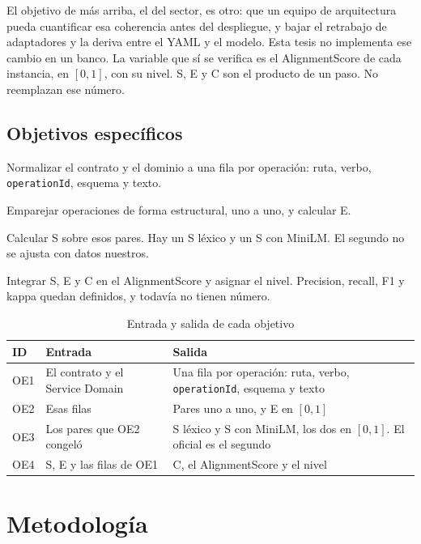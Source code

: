 El objetivo de más arriba, el del sector, es otro: que un equipo de arquitectura pueda cuantificar esa coherencia antes del despliegue, y bajar el retrabajo de adaptadores y la deriva entre el YAML y el modelo. Esta tesis no implementa ese cambio en un banco. La variable que sí se verifica es el AlignmentScore de cada instancia, en $[0,1]$, con su nivel. S, E y C son el producto de un paso. No reemplazan ese número.

\subsection{Objetivos específicos}

\begin{description}[style=nextline,leftmargin=2.2em]
  \item[OE1.] Normalizar el contrato y el dominio a una fila por operación: ruta, verbo, \texttt{operationId}, esquema y texto.
  \item[OE2.] Emparejar operaciones de forma estructural, uno a uno, y calcular E.
  \item[OE3.] Calcular S sobre esos pares. Hay un S léxico y un S con MiniLM. El segundo no se ajusta con datos nuestros.
  \item[OE4.] Integrar S, E y C en el AlignmentScore y asignar el nivel. Precision, recall, F1 y kappa quedan definidos, y todavía no tienen número.
\end{description}

\begin{table}[H]
  \centering
  \caption{Entrada y salida de cada objetivo}
  \label{tab:oe-io}
  \footnotesize
  \begin{tabular}{@{}p{}p{}p{}@{}}
    \toprule
    ID & Entrada & Salida \\
    \midrule
    OE1 & El contrato y el Service Domain & Una fila por operación: ruta, verbo, \texttt{operationId}, esquema y texto \\
    OE2 & Esas filas & Pares uno a uno, y E en $[0,1]$ \\
    OE3 & Los pares que OE2 congeló & S léxico y S con MiniLM, los dos en $[0,1]$. El oficial es el segundo \\
    OE4 & S, E y las filas de OE1 & C, el AlignmentScore y el nivel \\
    \bottomrule
  \end{tabular}
\end{table}

\section{Metodología}

